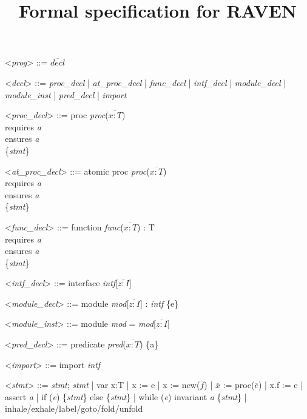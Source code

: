 \documentclass{article}
\begin{document}
	\title{Formal specification for RAVEN}
	\date{}
	
	\maketitle


	\begin{grammar}
	\let\syntleft\relax
	\let\syntright\relax

		
	<\textit{prog}> ::= $\overline{decl}$
	
	<\textit{decl}> ::= \textit{proc\_decl} | \textit{at\_proc\_decl} | \textit{func\_decl} | \textit{intf\_decl} | \textit{module\_decl} | \textit{module\_inst} | \textit{pred\_decl} | \textit{import}
	
	<\textit{proc\_decl}> ::=  proc \textit{proc}($\overline{x : T}$) \\
		requires \textit{a} \\
		ensures \textit{a} \\
		\{\textit{stmt}\}
		
	<\textit{at\_proc\_decl}> ::= atomic proc \textit{proc}($\overline{x : T}$) \\
	requires \textit{a} \\
	ensures \textit{a} \\
	\{\textit{stmt}\}
	
	<\textit{func\_decl}> ::= function \textit{func}($\overline{x : T}$) : T\\
	requires \textit{a} \\
	ensures \textit{a} \\
	\{\textit{stmt}\}
	
	<\textit{intf\_decl}> ::= interface \textit{intf}[$\overline{z : I}$] 
	
	<\textit{module\_decl}> ::= module \textit{mod}[$\overline{z : I}$] : \textit{intf} \{e\}
	
	<\textit{module\_inst}> ::= module \textit{mod} = \textit{mod}[$\overline{z : I}$]
	
	<\textit{pred\_decl}> ::= predicate \textit{pred}($\overline{x : T}$) \{a\}
	
	<\textit{import}> ::= import \textit{intf}
	
	<\textit{stmt}> ::= \textit{stmt}; \textit{stmt} | var x:T | x := e | x := new($\overline{f}$) | $\overline{x}$ := proc($\overline{e}$) | x.f := e | assert \textit{a} | if (\textit{e}) \{\textit{stmt}\} else \{\textit{stmt}\} | while (\textit{e}) invariant \textit{a} \{\textit{stmt}\} | inhale/exhale/label/goto/fold/unfold
		
\end{grammar}

\iffalse
- Grammar needs to be styled properly, specially wrt multi line declarations for procs/funcs/etc.
- How to represent optional parameters, for example the arguments for interfaces and modules.
- monospace font for the keywords
\fi
\end{document}
